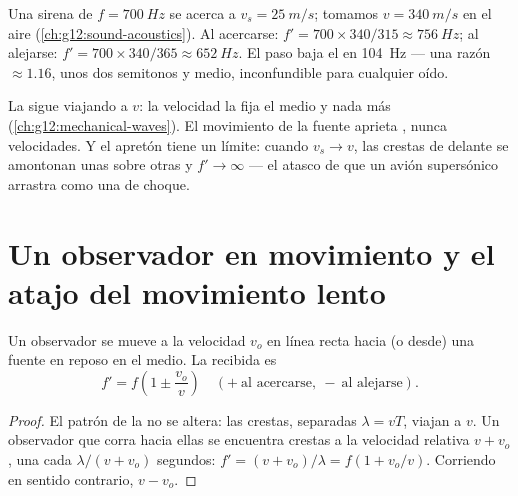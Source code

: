 \begin{example}\label{ex:g12:doppler-effect:siren}
Una sirena de $f = \qty{700}{Hz}$ se acerca a $v_s = \qty{25}{m/s}$;
tomamos $v = \qty{340}{m/s}$ en el aire
(\cref{ch:g12:sound-acoustics}). Al acercarse:
$f' = 700 \times 340/315 \approx \qty{756}{Hz}$; al alejarse:
$f' = 700 \times 340/365 \approx \qty{652}{Hz}$. El paso baja el  en
\qty{104}{Hz} --- una razón $\approx 1.16$, unos dos semitonos y medio,
inconfundible para cualquier oído.
\end{example}

\begin{remark}\label{rem:g12:doppler-effect:speed-unchanged}
La  sigue viajando a $v$: la velocidad la fija el medio y nada más
(\cref{ch:g12:mechanical-waves}). El movimiento de la fuente aprieta
\emph{}, nunca velocidades. Y el apretón tiene un
límite: cuando $v_s \to v$, las crestas de delante se amontonan unas
sobre otras y $f' \to \infty$ --- el atasco de  que un
avión supersónico arrastra como una  de choque.
\end{remark}

\section{Un observador en movimiento y el atajo del movimiento lento}

\begin{proposition}\label{prop:g12:doppler-effect:moving-observer}
Un observador se mueve a la velocidad $v_o$ en línea recta hacia (o
desde) una fuente en reposo en el medio. La  recibida es
\[ f' = f\left(1 \pm \frac{v_o}{v}\right) \quad (+\ \text{al acercarse},\ -\ \text{al alejarse}). \]
\end{proposition}

\begin{proof}
El patrón de la  no se altera: las crestas, separadas
$\lambda = vT$, viajan a $v$. Un observador que corra hacia ellas se
encuentra crestas a la velocidad relativa $v + v_o$, una cada
$\lambda/(v + v_o)$ segundos: $f' = (v + v_o)/\lambda = f(1 + v_o/v)$.
Corriendo en sentido contrario, $v - v_o$.
\end{proof}

